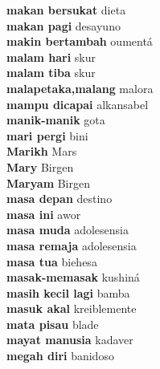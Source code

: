 \textbf{ makan bersukat  } dieta \\
\textbf{ makan pagi  } desayuno \\
\textbf{ makin bertambah  } oumentá \\
\textbf{ malam hari  } skur \\
\textbf{ malam tiba  } skur \\
\textbf{ malapetaka,malang  } malora \\
\textbf{ mampu dicapai  } alkansabel \\
\textbf{ manik-manik  } gota \\
\textbf{ mari pergi  } bini \\
\textbf{ Marikh  } Mars \\
\textbf{ Mary  } Birgen \\
\textbf{ Maryam  } Birgen \\
\textbf{ masa depan  } destino \\
\textbf{ masa ini  } awor \\
\textbf{ masa muda  } adolesensia \\
\textbf{ masa remaja  } adolesensia \\
\textbf{ masa tua  } biehesa \\
\textbf{ masak-memasak  } kushiná \\
\textbf{ masih kecil lagi  } bamba \\
\textbf{ masuk akal  } kreiblemente \\
\textbf{ mata pisau  } blade \\
\textbf{ mayat manusia  } kadaver \\
\textbf{ megah diri  } banidoso \\
